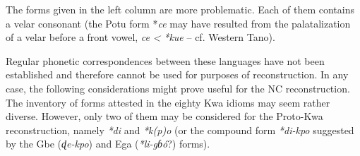 The forms given in the left column are more problematic. Each of them contains a velar consonant (the Potu form *\textit{ce} may have resulted from the palatalization of a velar before a front vowel, \textit{ce} \textit{<} \textit{*kue} – cf. Western Tano). 

Regular phonetic correspondences between these languages have not been established and therefore cannot be used for purposes of reconstruction. In any case, the following considerations might prove useful for the NC reconstruction. The inventory of forms attested in the eighty Kwa idioms may seem rather diverse. However, only two of them may be considered for the Proto-Kwa reconstruction, namely \textit{*di} and \textit{*k(p)o} (or the compound form \textit{*di-kpo} suggested by the Gbe (\textit{ɖe-kpo}) and Ega (\textit{*li-gɓó}?) forms).

